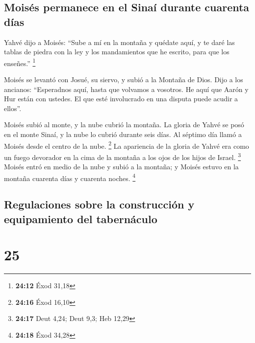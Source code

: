\hypertarget{moisuxe9s-permanece-en-el-sinauxed-durante-cuarenta-duxedas}{%
\subsection{Moisés permanece en el Sinaí durante cuarenta
días}\label{moisuxe9s-permanece-en-el-sinauxed-durante-cuarenta-duxedas}}

 Yahvé dijo a Moisés: ``Sube a mí en la montaña y quédate
aquí, y te daré las tablas de piedra con la ley y los mandamientos que
he escrito, para que los enseñes.'' \footnote{\textbf{24:12} Éxod 31,18}

 Moisés se levantó con Josué, su siervo, y subió a la
Montaña de Dios.  Dijo a los ancianos: ``Esperadnos aquí,
hasta que volvamos a vosotros. He aquí que Aarón y Hur están con
ustedes. El que esté involucrado en una disputa puede acudir a ellos''.

 Moisés subió al monte, y la nube cubrió la montaña.
 La gloria de Yahvé se posó en el monte Sinaí, y la nube
lo cubrió durante seis días. Al séptimo día llamó a Moisés desde el
centro de la nube. \footnote{\textbf{24:16} Éxod 16,10} 
La apariencia de la gloria de Yahvé era como un fuego devorador en la
cima de la montaña a los ojos de los hijos de Israel. \footnote{\textbf{24:17}
  Deut 4,24; Deut 9,3; Heb 12,29}  Moisés entró en medio
de la nube y subió a la montaña; y Moisés estuvo en la montaña cuarenta
días y cuarenta noches. \footnote{\textbf{24:18} Éxod 34,28}

\hypertarget{regulaciones-sobre-la-construcciuxf3n-y-equipamiento-del-tabernuxe1culo}{%
\subsection{Regulaciones sobre la construcción y equipamiento del
tabernáculo}\label{regulaciones-sobre-la-construcciuxf3n-y-equipamiento-del-tabernuxe1culo}}

\hypertarget{section-24}{%
\section{25}\label{section-24}}

